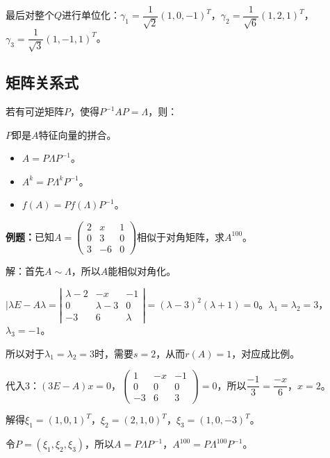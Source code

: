 \documentclass[UTF8, 12pt]{ctexart}
\begin{document}
最后对整个$Q$进行单位化：$\gamma_1=\dfrac{1}{\sqrt{2}}(1,0,-1)^T$，$\gamma_2=\dfrac{1}{\sqrt{6}}(1,2,1)^T$，$\gamma_3=\dfrac{1}{\sqrt{3}}(1,-1,1)^T$。

\subsection{矩阵关系式}

若有可逆矩阵$P$，使得$P^{-1}AP=\Lambda$，则：

$P$即是$A$特征向量的拼合。

\begin{itemize}
    \item $A=P\Lambda P^{-1}$。
    \item $A^k=P\Lambda^kP^{-1}$。
    \item $f(A)=Pf(\Lambda)P^{-1}$。
\end{itemize}

\textbf{例题：}已知$A=\left(\begin{array}{ccc}
    2 & x & 1 \\
    0 & 3 & 0 \\
    3 & -6 & 0
\end{array}\right)$相似于对角矩阵，求$A^{100}$。\medskip

解：首先$A\sim\Lambda$，所以$A$能相似对角化。

$\vert\lambda E-A\lambda=\left|\begin{array}{ccc}
    \lambda-2 & -x & -1 \\
    0 & \lambda-3 & 0 \\
    -3 & 6 & \lambda
\end{array}\right|=(\lambda-3)^2(\lambda+1)=0$。$\lambda_1=\lambda_2=3$，$\lambda_3=-1$。

所以对于$\lambda_1=\lambda_2=3$时，需要$s=2$，从而$r(A)=1$，对应成比例。

代入3：$(3E-A)x=0$，$\left(\begin{array}{ccc}
    1 & -x & -1 \\
    0 & 0 & 0 \\
    -3 & 6 & 3
\end{array}\right)=0$，所以$\dfrac{-1}{3}=\dfrac{-x}{6}$，$x=2$。

解得$\xi_1=(1,0,1)^T$，$\xi_2=(2,1,0)^T$，$\xi_3=(1,0,-3)^T$。

令$P=(\xi_1,\xi_2,\xi_3)$，所以$A=P\Lambda P^{-1}$，$A^{100}=P\Lambda^{100}P^{-1}$。
\end{document}
